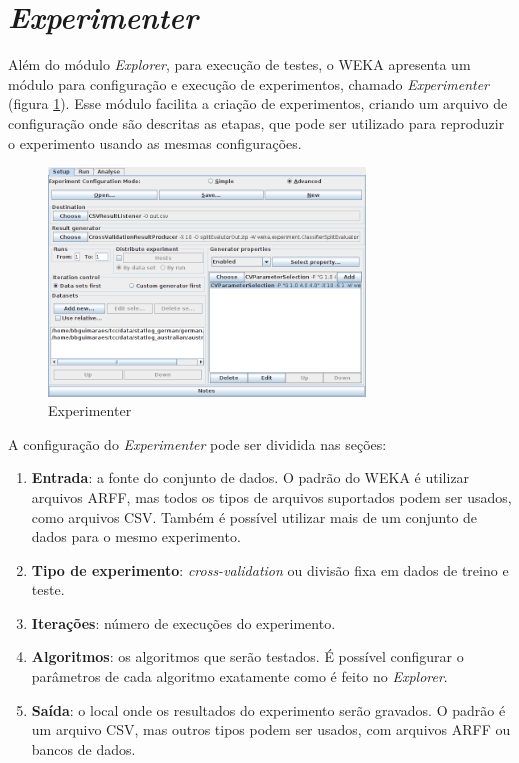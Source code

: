 \section{\emph{Experimenter}}

Além do módulo \emph{Explorer}, para execução de testes, o WEKA apresenta um módulo para configuração e execução de experimentos, chamado \emph{Experimenter} (figura \ref{fig:dev_weka_experimenter}). Esse módulo facilita a criação de experimentos, criando um arquivo de configuração onde são descritas as etapas, que pode ser utilizado para reproduzir o experimento usando as mesmas configurações.

\begin{figure}[h!]
\vspace{0.5cm}
    \centering
    \caption{Experimenter}
    \label{fig:dev_weka_experimenter}
    \vspace{0.5cm}
    \includegraphics[width=0.75\textwidth]{img/experimenter.png}
    \vspace{0.5cm}
\vspace{0.5cm}
\end{figure}

A configuração do \emph{Experimenter} pode ser dividida nas seções:

\begin{enumerate}
    \item \textbf{Entrada}: a fonte do conjunto de dados. O padrão do WEKA é utilizar arquivos ARFF, mas todos os tipos de arquivos suportados podem ser usados, como arquivos CSV. Também é possível utilizar mais de um conjunto de dados para o mesmo experimento.
    \item \textbf{Tipo de experimento}: \emph{cross-validation} ou divisão fixa em dados de treino e teste.
    \item \textbf{Iterações}: número de execuções do experimento.
    \item \textbf{Algoritmos}: os algoritmos que serão testados. É possível configurar o parâmetros de cada algoritmo exatamente como é feito no \emph{Explorer}.
    \item \textbf{Saída}: o local onde os resultados do experimento serão gravados. O padrão é um arquivo CSV, mas outros tipos podem ser usados, com arquivos ARFF ou bancos de dados.
\end{enumerate}

